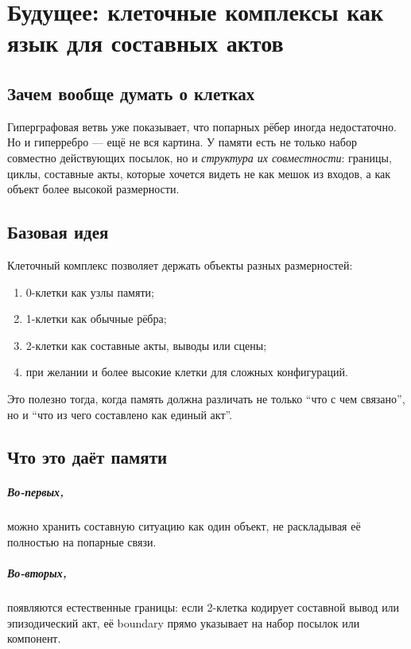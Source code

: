 \chapter{Будущее: клеточные комплексы как язык для составных актов}
\label{ch:cellcomplex}

\section{Зачем вообще думать о клетках}

Гиперграфовая ветвь уже показывает, что попарных рёбер иногда недостаточно. Но и
гиперребро — ещё не вся картина. У памяти есть не только набор совместно действующих
посылок, но и \emph{структура их совместности}: границы, циклы, составные акты,
которые хочется видеть не как мешок из входов, а как объект более высокой размерности.

\section{Базовая идея}

Клеточный комплекс позволяет держать объекты разных размерностей:
\begin{enumerate}
\item 0-клетки как узлы памяти;
\item 1-клетки как обычные рёбра;
\item 2-клетки как составные акты, выводы или сцены;
\item при желании и более высокие клетки для сложных конфигураций.
\end{enumerate}

Это полезно тогда, когда память должна различать не только ``что с чем связано'',
но и ``что из чего составлено как единый акт''.

\section{Что это даёт памяти}

\paragraph{Во-первых,} можно хранить составную ситуацию как один объект, не
раскладывая её полностью на попарные связи.

\paragraph{Во-вторых,} появляются естественные границы: если 2-клетка кодирует
составной вывод или эпизодический акт, её boundary прямо указывает на набор посылок
или компонент.

